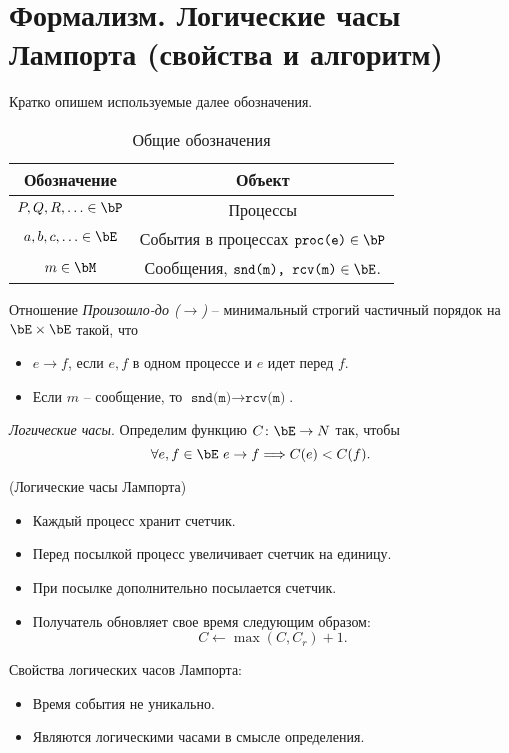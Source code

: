 \section{Формализм. Логические часы Лампорта (свойства и алгоритм)}

Кратко опишем используемые далее обозначения.

\begin{table}[!ht]
    \centering
    \begin{tabular}{|c|c|} \hline
        Обозначение & Объект \\ \hline
        $P, Q, R, \ldots \in \bP$ & Процессы \\ \hline
        $a, b, c, \ldots \in \bE$ & События в процессах $\texttt{proc(e)} \in \bP$
        \\ \hline
        $m \in \bM$ & Сообщения, $\texttt{snd(m), rcv(m)} \in \bE$. \\ \hline
    \end{tabular}
    \caption{Общие обозначения}
\end{table}

\begin{definition}
    Отношение \textit{Произошло-до ($\rightarrow$)} -- минимальный
    строгий частичный порядок на $\bE \times \bE$ такой, что
    \begin{itemize}
        \item $e \rightarrow f$, если $e, f$ в одном процессе и $e$ идет перед $f$.
        \item Если $m$ -- сообщение, то $\texttt{snd(m)} \rightarrow \texttt{rcv(m)}$.
    \end{itemize}
\end{definition}

\begin{definition}
    \textit{Логические часы}. Определим функцию $C \colon \bE \to N$ так, чтобы
\[
    \forall e, f \in \bE~ e \rightarrow f \Lra C(e) < C(f)
.\]
\end{definition}

\begin{algorithm}(Логические часы Лампорта)
    \begin{itemize}
        \item Каждый процесс хранит счетчик.
        \item Перед посылкой процесс увеличивает счетчик на единицу.
        \item При посылке дополнительно посылается счетчик.
        \item Получатель обновляет свое время следующим образом:
            \[
                C \leftarrow \max(C, C_r) + 1
            .\]
    \end{itemize}
\end{algorithm}

Свойства логических часов Лампорта: 
\begin{itemize}
    \item Время события не уникально.
    \item Являются логическими часами в смысле определения.
\end{itemize}

